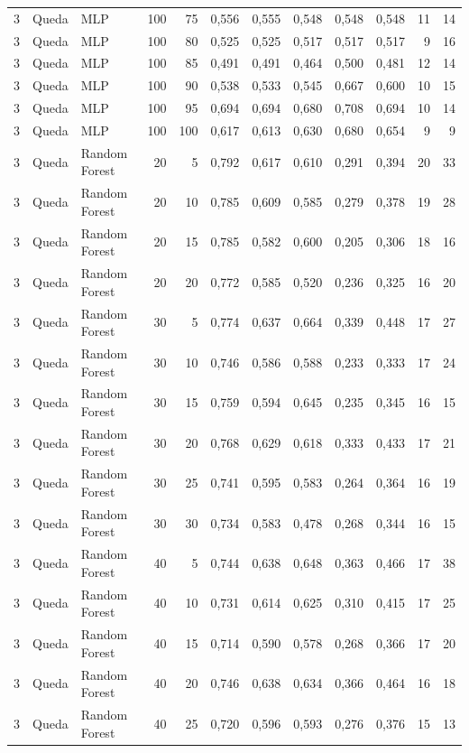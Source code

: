 \begin{longtable}{@{}rllrrrrrrrrr@{}}
3 & Queda & MLP & 100 & 75 & 0,556 & 0,555 & 0,548 & 0,548 & 0,548 & 11 & 14 \\
3 & Queda & MLP & 100 & 80 & 0,525 & 0,525 & 0,517 & 0,517 & 0,517 & 9 & 16 \\
3 & Queda & MLP & 100 & 85 & 0,491 & 0,491 & 0,464 & 0,500 & 0,481 & 12 & 14 \\
3 & Queda & MLP & 100 & 90 & 0,538 & 0,533 & 0,545 & 0,667 & 0,600 & 10 & 15 \\
3 & Queda & MLP & 100 & 95 & 0,694 & 0,694 & 0,680 & 0,708 & 0,694 & 10 & 14 \\
3 & Queda & MLP & 100 & 100 & 0,617 & 0,613 & 0,630 & 0,680 & 0,654 & 9 & 9 \\
3 & Queda & Random Forest & 20 & 5 & 0,792 & 0,617 & 0,610 & 0,291 & 0,394 & 20 & 33 \\
3 & Queda & Random Forest & 20 & 10 & 0,785 & 0,609 & 0,585 & 0,279 & 0,378 & 19 & 28 \\
3 & Queda & Random Forest & 20 & 15 & 0,785 & 0,582 & 0,600 & 0,205 & 0,306 & 18 & 16 \\
3 & Queda & Random Forest & 20 & 20 & 0,772 & 0,585 & 0,520 & 0,236 & 0,325 & 16 & 20 \\
3 & Queda & Random Forest & 30 & 5 & 0,774 & 0,637 & 0,664 & 0,339 & 0,448 & 17 & 27 \\
3 & Queda & Random Forest & 30 & 10 & 0,746 & 0,586 & 0,588 & 0,233 & 0,333 & 17 & 24 \\
3 & Queda & Random Forest & 30 & 15 & 0,759 & 0,594 & 0,645 & 0,235 & 0,345 & 16 & 15 \\
3 & Queda & Random Forest & 30 & 20 & 0,768 & 0,629 & 0,618 & 0,333 & 0,433 & 17 & 21 \\
3 & Queda & Random Forest & 30 & 25 & 0,741 & 0,595 & 0,583 & 0,264 & 0,364 & 16 & 19 \\
3 & Queda & Random Forest & 30 & 30 & 0,734 & 0,583 & 0,478 & 0,268 & 0,344 & 16 & 15 \\
3 & Queda & Random Forest & 40 & 5 & 0,744 & 0,638 & 0,648 & 0,363 & 0,466 & 17 & 38 \\
3 & Queda & Random Forest & 40 & 10 & 0,731 & 0,614 & 0,625 & 0,310 & 0,415 & 17 & 25 \\
3 & Queda & Random Forest & 40 & 15 & 0,714 & 0,590 & 0,578 & 0,268 & 0,366 & 17 & 20 \\
3 & Queda & Random Forest & 40 & 20 & 0,746 & 0,638 & 0,634 & 0,366 & 0,464 & 16 & 18 \\
3 & Queda & Random Forest & 40 & 25 & 0,720 & 0,596 & 0,593 & 0,276 & 0,376 & 15 & 13 \\

\end{longtable}
